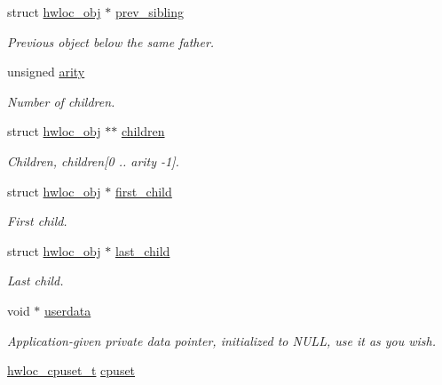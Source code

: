 \begin{DoxyCompactItemize}
struct \hyperlink{structhwloc__obj}{hwloc\_\-obj} $\ast$ \hyperlink{structhwloc__obj_a7b89e8c189876c0158a9282aaaf17f50}{prev\_\-sibling}
\begin{DoxyCompactList}\small\item\em Previous object below the same father. \item\end{DoxyCompactList}\item 
unsigned \hyperlink{structhwloc__obj_aac3f6da35c9b57599909a44ce2b716c1}{arity}
\begin{DoxyCompactList}\small\item\em Number of children. \item\end{DoxyCompactList}\item 
struct \hyperlink{structhwloc__obj}{hwloc\_\-obj} $\ast$$\ast$ \hyperlink{structhwloc__obj_a04d05403da37bfe17cd63b7c7dd07b1f}{children}
\begin{DoxyCompactList}\small\item\em Children, {\ttfamily children}\mbox{[}0 .. arity -\/1\mbox{]}. \item\end{DoxyCompactList}\item 
struct \hyperlink{structhwloc__obj}{hwloc\_\-obj} $\ast$ \hyperlink{structhwloc__obj_af51d08a0a79dba517c06c5afedc8d2dc}{first\_\-child}
\begin{DoxyCompactList}\small\item\em First child. \item\end{DoxyCompactList}\item 
struct \hyperlink{structhwloc__obj}{hwloc\_\-obj} $\ast$ \hyperlink{structhwloc__obj_a84bd65634dbc55f4158b74443a9bd04f}{last\_\-child}
\begin{DoxyCompactList}\small\item\em Last child. \item\end{DoxyCompactList}\item 
void $\ast$ \hyperlink{structhwloc__obj_a76fd3ac94401cf32dfccc3a3a8de68a5}{userdata}
\begin{DoxyCompactList}\small\item\em Application-\/given private data pointer, initialized to {\ttfamily NULL}, use it as you wish. \item\end{DoxyCompactList}\item 
\hyperlink{group__hwlocality__cpuset_ga7366332f7090f5b54d4b25a0c2c4b411}{hwloc\_\-cpuset\_\-t} \hyperlink{structhwloc__obj_a67925e0f2c47f50408fbdb9bddd0790f}{cpuset}
$$
\end{DoxyCompactItemize}
